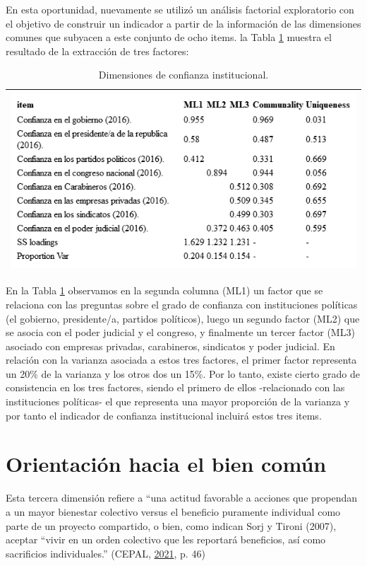 \documentclass[
  12pt,
]{book}
\begin{document}
En esta oportunidad, nuevamente se utilizó un análisis factorial exploratorio con el objetivo de construir un indicador a partir de la información de las dimensiones comunes que subyacen a este conjunto de ocho items. la Tabla \ref{tab:inst-fa} muestra el resultado de la extracción de tres factores:

\begin{longtable}[]{@{}l@{}}
\caption{\label{tab:inst-fa}Dimensiones de confianza institucional.}\tabularnewline
\toprule
\endhead
\includegraphics[width=6.77083in,height=\textheight]{output/tables/inst_fa.png}\tabularnewline
\bottomrule
\end{longtable}

En la Tabla \ref{tab:inst-fa} observamos en la segunda columna (ML1) un factor que se relaciona con las preguntas sobre el grado de confianza con instituciones políticas (el gobierno, presidente/a, partidos políticos), luego un segundo factor (ML2) que se asocia con el poder judicial y el congreso, y finalmente un tercer factor (ML3) asociado con empresas privadas, carabineros, sindicatos y poder judicial. En relación con la varianza asociada a estos tres factores, el primer factor representa un 20\% de la varianza y los otros dos un 15\%. Por lo tanto, existe cierto grado de consistencia en los tres factores, siendo el primero de ellos -relacionado con las instituciones políticas- el que representa una mayor proporción de la varianza y por tanto el indicador de confianza institucional incluirá estos tres items.

\hypertarget{orientaciuxf3n-hacia-el-bien-comuxfan}{%
\section{Orientación hacia el bien común}\label{orientaciuxf3n-hacia-el-bien-comuxfan}}

Esta tercera dimensión refiere a ``una actitud favorable a acciones que propendan a un mayor bienestar colectivo versus el beneficio puramente individual como parte de un proyecto compartido, o bien, como indican Sorj y Tironi (2007), aceptar ``vivir en un orden colectivo que les reportará beneficios, así como sacrificios individuales.'' (CEPAL, \protect\hyperlink{ref-cepal_cohesion_2021}{2021}, p. 46)
\end{document}
